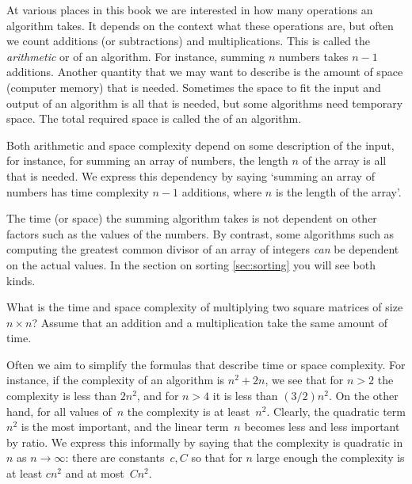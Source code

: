 

At various places in this book we are interested in how many
operations an algorithm takes. It depends on the context what these
operations are, but often we count additions (or subtractions) and
multiplications. This is called the \emph{arithmetic} or
of an algorithm. For
instance, summing $n$ numbers takes $n-1$ additions.  Another quantity
that we may want to describe is the amount of space (computer memory)
that is needed. Sometimes the space to fit the input and output of an
algorithm is all that is needed, but some algorithms need temporary
space. The total required space is called the
of an algorithm.

Both arithmetic and space complexity depend on some description of the
input, for instance, for summing an array of numbers, the length $n$
of the array is all that is needed. We express this dependency by
saying `summing an array of numbers has time complexity $n-1$
additions, where $n$ is the length of the array'.

The time (or space) the summing algorithm takes is not dependent on
other factors such as the values of the numbers.  By contrast, some
algorithms such as computing the greatest common divisor of an array
of integers \emph{can} be dependent on the actual values.
In the section on sorting \ref{sec:sorting} you will see both kinds.

\begin{exercise}
  What is the time and space complexity of multiplying two square
  matrices of size $n\times n$? Assume that an addition and a
  multiplication take the same amount of time.
\end{exercise}

Often we aim to simplify the formulas that describe time or space
complexity. For instance, if the complexity of an algorithm is
$n^2+2n$, we see that for $n>2$ the complexity is less than $2n^2$,
and for $n>4$ it is less than $(3/2)n^2$. On the other hand, for all
values of~$n$ the complexity is at least~$n^2$.  Clearly, the
quadratic term $n^2$ is the most important, and the linear term~$n$
becomes less and less important by ratio. We express this informally
by saying that the complexity is quadratic in $n$ as
$n\rightarrow\infty$: there are constants~$c,C$ so that for $n$ large
enough the complexity is at least $cn^2$ and at most~$Cn^2$. 

